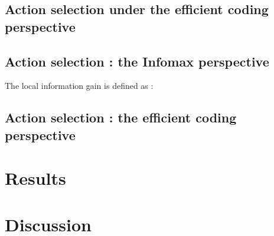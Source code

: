 \documentclass[12pt,twoside,openright]{article}
\begin{document}
\subsection{Action selection under the efficient coding perspective}


\subsection{Action selection : the Infomax perspective}

The local information gain is defined as :


\subsection{Action selection : the efficient coding perspective}

\section{Results} \label{sec:results}

\section{Discussion}



\end{document}

